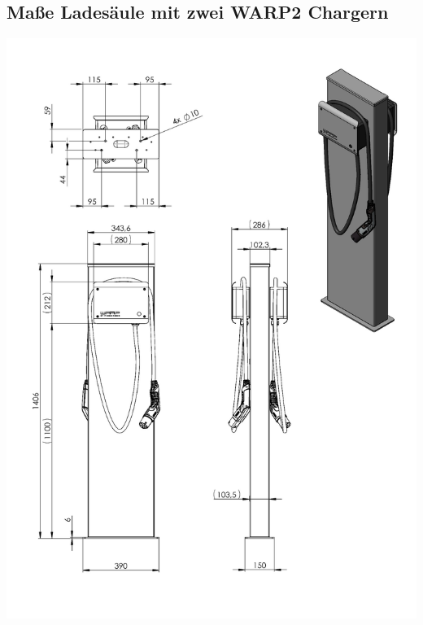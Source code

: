 \documentclass[a4paper,10pt]{article}
\begin{document}
	\subsection{Maße Ladesäule mit zwei WARP2 Chargern}
	\label{appendix_stand2}
	\begin{center}
		\includegraphics[width=0.9\linewidth]{./img/stand_2}
	\end{center}
\end{document}

